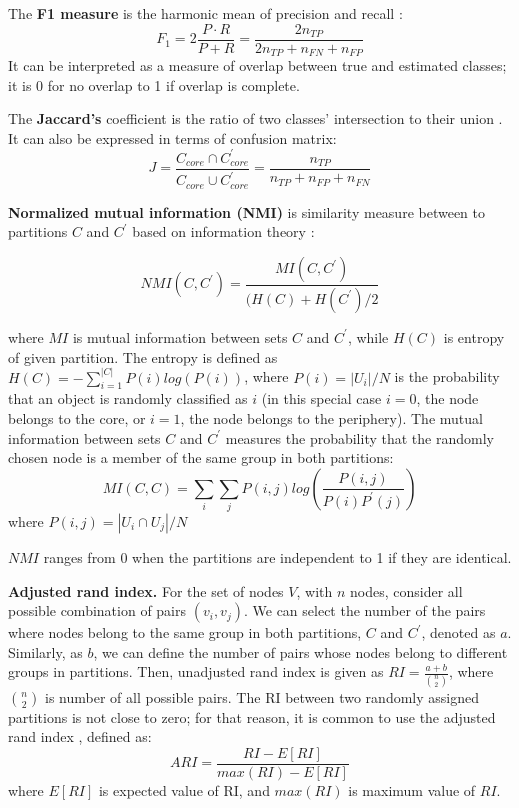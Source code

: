 The \textbf{F1 measure} is the harmonic mean of precision and recall \cite{labatut2012accuracy}:
\begin{equation}
F_1 = 2\frac{P \cdot R}{P+R} = \frac{2n_{TP}}{2n_{TP}+n_{FN} + n_{FP}}
\end{equation}
It can be interpreted as a measure of overlap between true and estimated classes; it is 0 for no overlap to 1 if overlap is complete.

The \textbf{Jaccard's} coefficient is the ratio of two classes' intersection to their union \cite{labatut2012accuracy}. It can also be expressed in terms of confusion matrix: 
\begin{equation}
J =  \frac{C_{core} \cap C^{'}_{core}}{C_{core} \cup C^{'}_{core}} =   \frac{n_{TP}}{n_{TP}+n_{FP} + n_{FN}}
\end{equation}

\textbf{Normalized mutual information (NMI)} is similarity measure between to partitions $C$ and $C^{'}$  based on information theory \cite{danon2005comparing}:

\begin{equation}
NMI(C, C^{'}) = \frac{MI(C, C^{'})}{(H(C)+H(C^{'})/2}
\end{equation}

where $MI$ is mutual information between sets $C$ and $C^{'}$, while $H(C)$ is entropy of given partition. The entropy is defined as $H(C) = - \sum_{i=1}^{|C|}P(i)log(P(i))$, where $P(i) = |U_i|/N$ is the probability that an object is randomly classified as $i$ (in this special case $i=0$, the node belongs to the core, or $i=1$, the node belongs to the periphery). The mutual information between sets $C$ and $C^{'}$ measures the probability that the randomly chosen node is a member of the same group in both partitions:
\begin{equation}
MI(C, C) = \sum_i\sum_j P(i, j) log(\frac{P(i,j)}{P(i)P^{'}(j)})    
\end{equation}
where $P(i, j)= |U_i \cap U_j|/N$

$NMI$ ranges from 0 when the partitions are independent to 1 if they are identical.   

\textbf{Adjusted rand index.} For the set of nodes $V$, with $n$ nodes, consider all possible combination of pairs $(v_i, v_j)$. We can select the number of the pairs where nodes belong to the same group in both partitions, $C$ and  $C^{'}$, denoted as $a$. Similarly, as $b$, we can define the number of pairs whose nodes belong to different groups in partitions. Then, unadjusted rand index \cite{santos2009use} is given as $RI = \frac{a+b}{\binom{n}{2}}$, where $\binom{n}{2}$ is number of all possible pairs. The RI between two randomly assigned partitions is not close to zero; for that reason, it is common to use the adjusted rand index \cite{hubert1985comparing} , defined as:
\begin{equation}
ARI = \frac{RI - E[RI]}{max(RI)- E[RI]}
\end{equation}
where $E[RI]$ is expected value of RI, and $max(RI)$ is maximum value of $RI$. 

